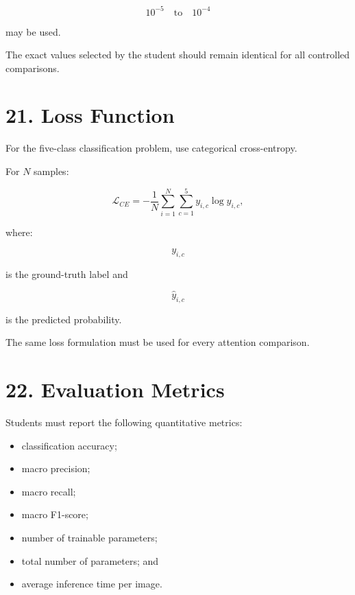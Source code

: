 \documentclass[10pt]{article}
\begin{document}
\[
10^{-5}
\quad\text{to}\quad
10^{-4}
\]

may be used.

The exact values selected by the student should remain identical for all
controlled comparisons.

\section*{21. Loss Function}

For the five-class classification problem, use categorical cross-entropy.

For $N$ samples:

\[
\mathcal{L}_{CE}
=
-
\frac{1}{N}
\sum_{i=1}^{N}
\sum_{c=1}^{5}
y_{i,c}
\log
\widehat{y}_{i,c},
\]

where:

\[
y_{i,c}
\]

is the ground-truth label and

\[
\widehat{y}_{i,c}
\]

is the predicted probability.

The same loss formulation must be used for every attention comparison.

\section*{22. Evaluation Metrics}

Students must report the following quantitative metrics:

\begin{itemize}

\item classification accuracy;

\item macro precision;

\item macro recall;

\item macro F1-score;

\item number of trainable parameters;

\item total number of parameters; and

\item average inference time per image.

\end{itemize}
\end{document}
